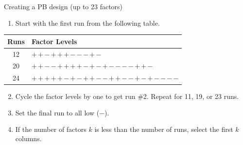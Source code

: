 \documentclass[
  10pt,
  ignorenonframetext,
]{beamer}
\providecommand{\tightlist}{%
  \setlength{\itemsep}{0pt}\setlength{\parskip}{0pt}}
\begin{document}
\begin{frame}{Creating a PB design (up to 23 factors)}
\protect\hypertarget{creating-a-pb-design-up-to-23-factors}{}
\begin{enumerate}
\tightlist
\item
  Start with the first run from the following table.
\end{enumerate}

\medskip
\begin{center}
\begin{tabular}{cl}
Runs & Factor Levels \\
\hline
12 & \ensuremath{\boldsymbol{+}}\,\ensuremath{\boldsymbol{+}}\,\ensuremath{\boldsymbol{-}}\,\ensuremath{\boldsymbol{+}}\,\ensuremath{\boldsymbol{+}}\,\ensuremath{\boldsymbol{+}}\,\ensuremath{\boldsymbol{-}}\,\ensuremath{\boldsymbol{-}}\,\ensuremath{\boldsymbol{-}}\,\ensuremath{\boldsymbol{+}}\,\ensuremath{\boldsymbol{-}}\\
20 & \ensuremath{\boldsymbol{+}}\,\ensuremath{\boldsymbol{+}}\,\ensuremath{\boldsymbol{-}}\,\ensuremath{\boldsymbol{-}}\,\ensuremath{\boldsymbol{+}}\,\ensuremath{\boldsymbol{+}}\,\ensuremath{\boldsymbol{+}}\,\ensuremath{\boldsymbol{+}}\,\ensuremath{\boldsymbol{-}}\,\ensuremath{\boldsymbol{+}}\,\ensuremath{\boldsymbol{-}}\,\ensuremath{\boldsymbol{+}}\,\ensuremath{\boldsymbol{-}}\,\ensuremath{\boldsymbol{-}}\,\ensuremath{\boldsymbol{-}}\,\ensuremath{\boldsymbol{-}}\,\ensuremath{\boldsymbol{+}}\,\ensuremath{\boldsymbol{+}}\,\ensuremath{\boldsymbol{-}}\\
24 & \ensuremath{\boldsymbol{+}}\,\ensuremath{\boldsymbol{+}}\,\ensuremath{\boldsymbol{+}}\,\ensuremath{\boldsymbol{+}}\,\ensuremath{\boldsymbol{+}}\,\ensuremath{\boldsymbol{-}}\,\ensuremath{\boldsymbol{+}}\,\ensuremath{\boldsymbol{-}}\,\ensuremath{\boldsymbol{+}}\,\ensuremath{\boldsymbol{+}}\,\ensuremath{\boldsymbol{-}}\,\ensuremath{\boldsymbol{-}}\,\ensuremath{\boldsymbol{+}}\,\ensuremath{\boldsymbol{+}}\,\ensuremath{\boldsymbol{-}}\,\ensuremath{\boldsymbol{-}}\,\ensuremath{\boldsymbol{+}}\,\ensuremath{\boldsymbol{-}}\,\ensuremath{\boldsymbol{+}}\,\ensuremath{\boldsymbol{-}}\,\ensuremath{\boldsymbol{-}}\,\ensuremath{\boldsymbol{-}}\,\ensuremath{\boldsymbol{-}}
\end{tabular}
\end{center}
\medskip

\begin{enumerate}
\setcounter{enumi}{1}
\item
  Cycle the factor levels by one to get run \#2. Repeat for 11, 19, or
  23 runs.
\item
  Set the final run to all low (\ensuremath{\boldsymbol{-}}).
\item
  If the number of factors \(k\) is less than the number of runs, select
  the first \(k\) columns.
\end{enumerate}
\end{frame}
\end{document}
